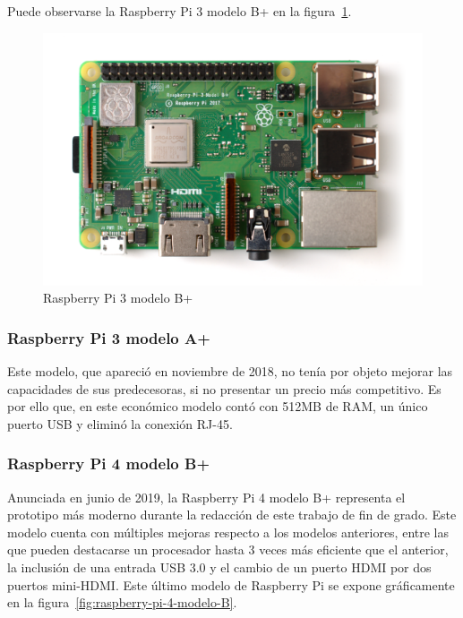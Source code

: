 \noindent Puede observarse la Raspberry Pi 3 modelo B+ en la figura~\ref{fig:raspberry-pi-3-modelo-Bplus}.

\begin{figure}[tbp]
\centering
\includegraphics[scale = 0.3]{fig/Raspberry-Pi-3-modelo-B+.png}
\caption{Raspberry Pi 3 modelo B+}
\label{fig:raspberry-pi-3-modelo-Bplus}
\end{figure}

\subsubsection{Raspberry Pi 3 modelo A+}

\noindent Este modelo, que apareció en noviembre de 2018, no tenía por objeto mejorar las capacidades de sus predecesoras, si no presentar un precio más competitivo. Es por ello que, en este económico modelo contó con 512MB de RAM, un único puerto USB y eliminó la conexión RJ-45.

\subsubsection{Raspberry Pi 4 modelo B+}

\noindent Anunciada en junio de 2019, la Raspberry Pi 4 modelo B+ representa el prototipo más moderno durante la redacción de este trabajo de fin de grado. Este modelo cuenta con múltiples mejoras respecto a los modelos anteriores, entre las que pueden destacarse un procesador hasta 3 veces más eficiente que el anterior, la inclusión de una entrada USB 3.0 y el cambio de un puerto HDMI por dos puertos mini-HDMI. Este último modelo de Raspberry Pi se expone gráficamente en la figura~\ref{fig:raspberry-pi-4-modelo-B}.

